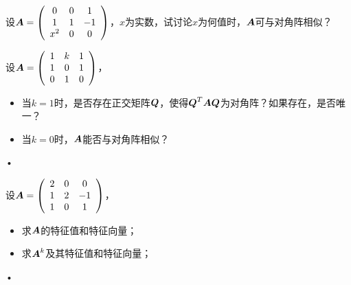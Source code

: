         \begin{frame}
          \begin{li}[05-06下]
            设$\boldsymbol{A}=\left(
              \begin{array}{ccc}
                0&0&1\\
                1&1&-1\\
                x^2&0&0
              \end{array}
            \right)$，$x$为实数，试讨论$x$为何值时，$\boldsymbol{A}$可与对角阵相似？
          \end{li}
          
        \end{frame}


        \begin{frame} 
          
          \begin{li}[06-07上，08-09上]
            设$\boldsymbol{A}=\left(
              \begin{array}{ccc}
                1&k&1\\
                1&0&1\\
                0&1&0
              \end{array}
            \right)$，
            \begin{itemize}
            \item 当$k=1$时，是否存在正交矩阵$\boldsymbol{Q}$，使得$\boldsymbol{Q}^T\boldsymbol{A}\boldsymbol{Q}$为对角阵？如果存在，是否唯一？
            \item 当$k=0$时，$\boldsymbol{A}$能否与对角阵相似？

            \end{itemize}•
          \end{li}
        \end{frame}

        \begin{frame}
          \begin{li}[07-08上]
            设$\boldsymbol{A}=\left(
              \begin{array}{ccc}
                2&0&0\\
                1&2&-1\\
                1&0&1
              \end{array}
            \right)$，
            \begin{itemize}
            \item 求$\boldsymbol{A}$的特征值和特征向量；
            \item 求$\boldsymbol{A}^k$及其特征值和特征向量；
            \end{itemize}•
          \end{li}
          
        \end{frame}


